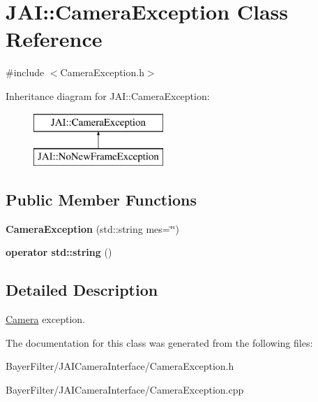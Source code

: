 \hypertarget{class_j_a_i_1_1_camera_exception}{\section{J\-A\-I\-:\-:Camera\-Exception Class Reference}
\label{class_j_a_i_1_1_camera_exception}
}


{\ttfamily \#include $<$Camera\-Exception.\-h$>$}

Inheritance diagram for J\-A\-I\-:\-:Camera\-Exception\-:\begin{figure}[H]
\begin{center}
\leavevmode
\includegraphics[height=2.000000cm]{class_j_a_i_1_1_camera_exception}
\end{center}
\end{figure}
\subsection*{Public Member Functions}
\begin{DoxyCompactItemize}
\item 
\hypertarget{class_j_a_i_1_1_camera_exception_a2210d720e70c3697f9d74c18440c524b}{{\bfseries Camera\-Exception} (std\-::string mes=\char`\"{}\char`\"{})}\label{class_j_a_i_1_1_camera_exception_a2210d720e70c3697f9d74c18440c524b}

\item 
\hypertarget{class_j_a_i_1_1_camera_exception_a88ed1f1b0e504e34cd2f2a2037e6ad2b}{{\bfseries operator std\-::string} ()}\label{class_j_a_i_1_1_camera_exception_a88ed1f1b0e504e34cd2f2a2037e6ad2b}

\end{DoxyCompactItemize}


\subsection{Detailed Description}
\hyperlink{class_j_a_i_1_1_camera}{Camera} exception. 

The documentation for this class was generated from the following files\-:\begin{DoxyCompactItemize}
\item 
Bayer\-Filter/\-J\-A\-I\-Camera\-Interface/Camera\-Exception.\-h\item 
Bayer\-Filter/\-J\-A\-I\-Camera\-Interface/Camera\-Exception.\-cpp\end{DoxyCompactItemize}
